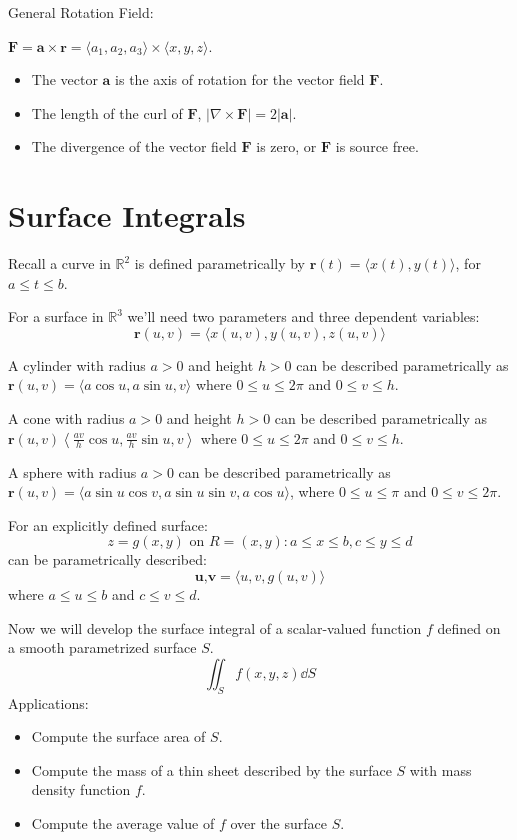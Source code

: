 \documentclass[../calc3.tex]{subfiles}
\begin{document}
General Rotation Field:

$\textbf{F}=\textbf{a}\times\textbf{r}=\langle a_1,a_2,a_3 \rangle \times \langle x,y,z \rangle$.
\begin{itemize}
    \item The vector $\textbf{a}$ is the axis of rotation for the vector field $\textbf{F}$.
    \item The length of the curl of $\textbf{F}$, $|\nabla \times \textbf{F}| = 2|\textbf{a}|$.
    \item The divergence of the vector field $\textbf{F}$ is zero, or $\textbf{F}$ is source free.
\end{itemize}



\section{Surface Integrals}
Recall a curve in $\mathbb{R}^2$ is defined parametrically by $\textbf{r}(t)=\langle x(t), y(t)\rangle$, for $a\leq t\leq b$.

For a surface in $\mathbb{R}^3$ we'll need two parameters and three dependent variables:
\[\textbf{r}(u,v)=\langle x(u,v), y(u,v), z(u,v)\rangle\]

A cylinder with radius $a>0$ and height $h>0$ can be described parametrically as $\textbf{r}(u,v)=\langle a\cos u, a\sin u, v\rangle$ where $0\leq u\leq 2\pi$ and $0\leq v\leq h$.

A cone with radius $a>0$ and height $h>0$ can be described parametrically as $\textbf{r}(u,v)\left\langle \frac{av}{h}\cos u, \frac{av}{h} \sin u , v \right\rangle$ where $0\leq u\leq 2\pi$ and $0\leq v\leq h$.

A sphere with radius $a>0$ can be described parametrically as $\textbf{r}(u,v)=\langle a\sin u\cos v, a\sin u \sin v, a\cos u\rangle$, where $0\leq u\leq \pi$ and $0\leq v\leq 2\pi$.

For an explicitly defined surface:
\[z=g(x,y) \text{ on } R={(x,y): a\leq x\leq b, c\leq y\leq d}\]
can be parametrically described:
\[\textbf{u,v}=\langle u,v,g(u,v)\rangle\]
where $a\leq u\leq b$ and $c\leq v\leq d$.

Now we will develop the surface integral of a scalar-valued function $f$ defined on a smooth parametrized surface $S$.
\[\iint_S f(x,y,z)\dd S\]
Applications:
\begin{itemize}
    \item Compute the surface area of $S$.
    \item Compute the mass of a thin sheet described by the surface $S$ with mass density function $f$.
    \item Compute the average value of $f$ over the surface $S$.
\end{itemize}
\end{document}
